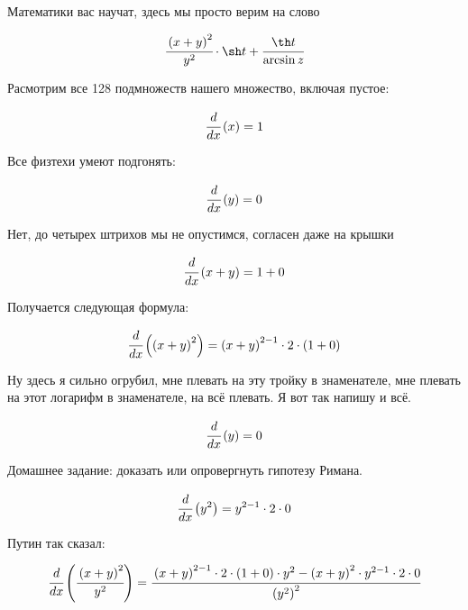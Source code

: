 
\usepackage{upgreek}







Математики вас научат, здесь мы просто верим на слово


\begin{dmath}
\cfrac{\left(x + y\right)^{2}}{y^{2}} \cdot \sh t + \cfrac{\th t}{\arcsin z}
\end{dmath}


Расмотрим все 128 подмножеств нашего множество, включая пустое:


\begin{dmath}
 \cfrac{d}{d x} \left( x \right) = 1 
\end{dmath}


Все физтехи умеют подгонять:


\begin{dmath}
 \cfrac{d}{d x} \left( y \right) = 0 
\end{dmath}


Нет, до четырех штрихов мы не опустимся, согласен даже на крышки


\begin{dmath}
 \cfrac{d}{d x} \left( x + y \right) = 1 + 0 
\end{dmath}


Получается следующая формула:


\begin{dmath}
 \cfrac{d}{d x} \left( \left(x + y\right)^{2} \right) = \left(x + y\right)^{2 - 1} \cdot 2 \cdot \left(1 + 0\right) 
\end{dmath}


Ну здесь я сильно огрубил, мне плевать на эту тройку в знаменателе, мне плевать на этот логарифм в знаменателе, на всё плевать. Я вот так напишу и всё.


\begin{dmath}
 \cfrac{d}{d x} \left( y \right) = 0 
\end{dmath}


Домашнее задание: доказать или опровергнуть гипотезу Римана.


\begin{dmath}
 \cfrac{d}{d x} \left( y^{2} \right) = y^{2 - 1} \cdot 2 \cdot 0 
\end{dmath}


Путин так сказал:


\begin{dmath}
 \cfrac{d}{d x} \left( \cfrac{\left(x + y\right)^{2}}{y^{2}} \right) = \cfrac{\left(x + y\right)^{2 - 1} \cdot 2 \cdot \left(1 + 0\right) \cdot y^{2} - \left(x + y\right)^{2} \cdot y^{2 - 1} \cdot 2 \cdot 0}{\left(y^{2}\right)^{2}} 
\end{dmath}


